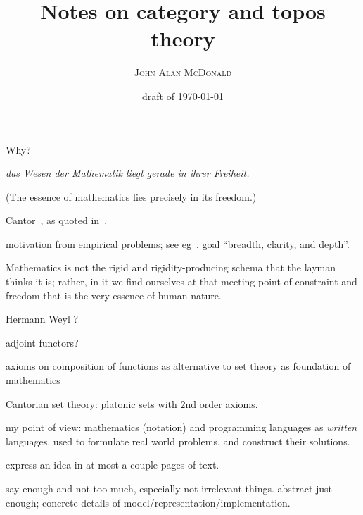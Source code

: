 \documentclass[10pt,openany]{book}
\title{Notes on category and topos theory}
\author{\textsc{John Alan McDonald}}
\date{draft of \today}
\begin{document}
\maketitle

\setcounter{baseSectionLevel}{6}


% 
\setcounter{currentlevel}{\value{baseSectionLevel}}
\label{sec:Preface-2020-07-15}

Why?

\epigraph{
\textsl{das Wesen der Mathematik liegt gerade in ihrer Freiheit.}
\par
(The essence of mathematics lies precisely in its freedom.)}%
{Cantor~\cite{Cantor1883},
as quoted in~\cite{ferreiros2007labyrinth}.}

motivation from empirical problems; 
see eg~\cite{maclane1981mathModels}.
goal ``breadth, clarity, and depth''.

\epigraph{
Mathematics is not the rigid and rigidity-producing schema 
that the layman thinks it is; 
rather, in it we find ourselves at that meeting point 
of constraint and freedom 
that is the very essence of human nature.}%
{Hermann Weyl ?}


adjoint functors?

axioms on composition of functions as alternative to set theory
as foundation of mathematics

Cantorian set theory: platonic sets with $2$nd order axioms.

my point of view: 
mathematics (notation) and programming languages
as \textit{written} languages,
used to formulate real world problems,
and construct their solutions.

express an idea in at most a couple pages of text.

say enough and not too much, especially not irrelevant things.
abstract just enough; 
concrete details of model/representation/implementation.
\end{document}
